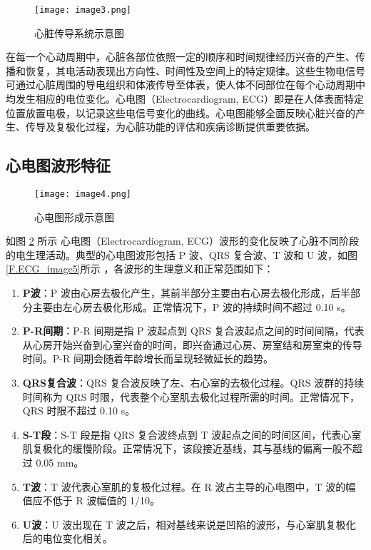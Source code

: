\begin{figure}[hbt]
    \centering
    \texttt{[image: image3.png]}
    \caption{心脏传导系统示意图}
    \label{F.ECG_image3}
\end{figure}

在每一个心动周期中，心脏各部位依照一定的顺序和时间规律经历兴奋的产生、传播和恢复，其电活动表现出方向性、时间性及空间上的特定规律。这些生物电信号可通过心脏周围的导电组织和体液传导至体表，使人体不同部位在每个心动周期中均发生相应的电位变化。心电图（Electrocardiogram, ECG）即是在人体表面特定位置放置电极，以记录这些电信号变化的曲线。心电图能够全面反映心脏兴奋的产生、传导及复极化过程，为心脏功能的评估和疾病诊断提供重要依据。

\subsection{心电图波形特征}

\begin{figure}[hbt]
    \centering
    \texttt{[image: image4.png]}
    \caption{心电图形成示意图}
    \label{F.ECG_image4}
\end{figure}

如图 \ref{F.ECG_image4} 所示 \cite{人体解剖生理学} 心电图（Electrocardiogram, ECG）波形的变化反映了心脏不同阶段的电生理活动。典型的心电图波形包括 P 波、QRS 复合波、T 波和 U 波，如图\ref{F.ECG_image5}所示 \cite{现代医学电子仪器原理与设计} ，各波形的生理意义和正常范围如下：

\begin{enumerate}
    \item \textbf{P波}：P 波由心房去极化产生，其前半部分主要由右心房去极化形成，后半部分主要由左心房去极化形成。正常情况下，P 波的持续时间不超过 0.10 s。

    \item \textbf{P-R间期}：P-R 间期是指 P 波起点到 QRS 复合波起点之间的时间间隔，代表从心房开始兴奋到心室兴奋的时间，即兴奋通过心房、房室结和房室束的传导时间。P-R 间期会随着年龄增长而呈现轻微延长的趋势。

    \item \textbf{QRS复合波}：QRS 复合波反映了左、右心室的去极化过程。QRS 波群的持续时间称为 QRS 时限，代表整个心室肌去极化过程所需的时间。正常情况下，QRS 时限不超过 0.10 s。
    
    \item \textbf{S-T段}：S-T 段是指 QRS 复合波终点到 T 波起点之间的时间区间，代表心室肌复极化的缓慢阶段。正常情况下，该段接近基线，其与基线的偏离一般不超过 0.05 mm。

    \item \textbf{T波}：T 波代表心室肌的复极化过程。在 R 波占主导的心电图中，T 波的幅值应不低于 R 波幅值的 1/10。

    \item \textbf{U波}：U 波出现在 T 波之后，相对基线来说是凹陷的波形，与心室肌复极化后的电位变化相关。
\end{enumerate}

